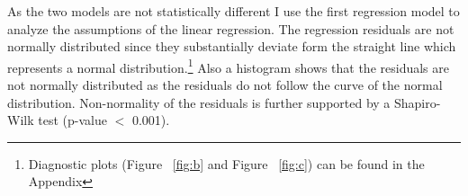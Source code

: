 \documentclass[10pt,a4paper]{article}
\begin{document}
\begin{table}[!htbp] 
\centering 
\caption{Regression Results}\label{tab:b}
\end{table}




As the two models are not statistically different I use the first regression model to analyze the assumptions of the linear regression. The regression residuals are not normally distributed since they substantially deviate form the straight line which represents a normal distribution.\footnote{Diagnostic plots (Figure ~\ref{fig:b} and Figure ~\ref{fig:c}) can be found in the Appendix} Also a histogram shows that the residuals are not normally distributed as the residuals do not follow the curve of the normal distribution. Non-normality of the residuals is further supported by a Shapiro-Wilk test (p-value $<$ 0.001).\\
\end{document}
